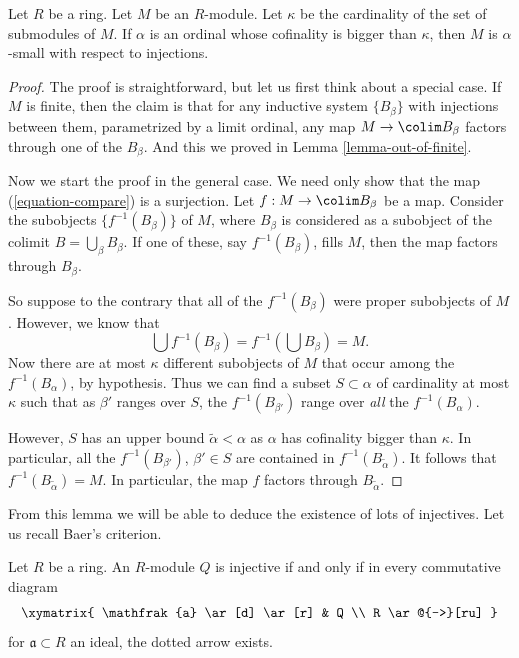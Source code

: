 \begin{proposition}
\label{proposition-modules-are-small}
Let $R$ be a ring. Let $M$ be an $R$-module.
Let $\kappa$ be the cardinality of the set of submodules of $M$.
If $\alpha$ is an ordinal whose cofinality is bigger than $\kappa$,
then $M$ is $\alpha$-small with respect to injections.
\end{proposition}

\begin{proof}
The proof is straightforward, but let us first think about a special case.
If $M$ is finite, then the claim is that for any inductive system
$\{B_\beta\}$ with injections between them, parametrized by a
limit ordinal, any map $M \to \colim B_\beta$ factors through one of
the $B_\beta$. And this we proved in
Lemma \ref{lemma-out-of-finite}.

\medskip\noindent
Now we start the proof in the general case.
We need only show that the map (\ref{equation-compare}) is a surjection.
Let $f : M \to \colim B_\beta$ be a map.
Consider the subobjects $\{f^{-1}(B_\beta)\}$ of $M$, where $B_\beta$
is considered as a subobject of the colimit $B = \bigcup_\beta B_\beta$.
If one of these, say $f^{-1}(B_\beta)$, fills $M$,
then the map factors through $B_\beta$.

\medskip\noindent
So suppose to the contrary that all of the $f^{-1}(B_\beta)$ were proper
subobjects of $M$. However, we know that
$$
\bigcup f^{-1}(B_\beta) = f^{-1}\left(\bigcup B_\beta\right) = M.
$$
Now there are at most $\kappa$ different subobjects of $M$ that occur among
the $f^{-1}(B_\alpha)$, by hypothesis.
Thus we can find a subset $S \subset \alpha$ of cardinality at most
$\kappa$ such that as $\beta'$ ranges over $S$, the
$f^{-1}(B_{\beta'})$ range over \emph{all} the $f^{-1}(B_\alpha)$.

\medskip\noindent
However, $S$ has an upper bound $\widetilde{\alpha} < \alpha$ as
$\alpha$ has cofinality bigger than $\kappa$. In particular, all the
$f^{-1}(B_{\beta'})$, $\beta' \in S$ are contained in
$f^{-1}(B_{\widetilde{\alpha}})$.
It follows that $f^{-1}(B_{\widetilde{\alpha}}) = M$.
In particular, the map $f$ factors through $B_{\widetilde{\alpha}}$.
\end{proof}

\noindent
From this lemma we will be able to deduce the existence of lots of injectives.
Let us recall Baer's criterion.

\begin{lemma}
\label{lemma-criterion-baer}
\begin{reference}
\cite[Theorem 1]{Baer}
\end{reference}
Let $R$ be a ring. An $R$-module $Q$ is injective if and only if in every
commutative diagram
$$
\xymatrix{
\mathfrak{a} \ar[d] \ar[r] &  Q \\
R \ar@{-->}[ru]
}
$$
for $\mathfrak{a} \subset R$ an ideal, the dotted arrow exists.
\end{lemma}

